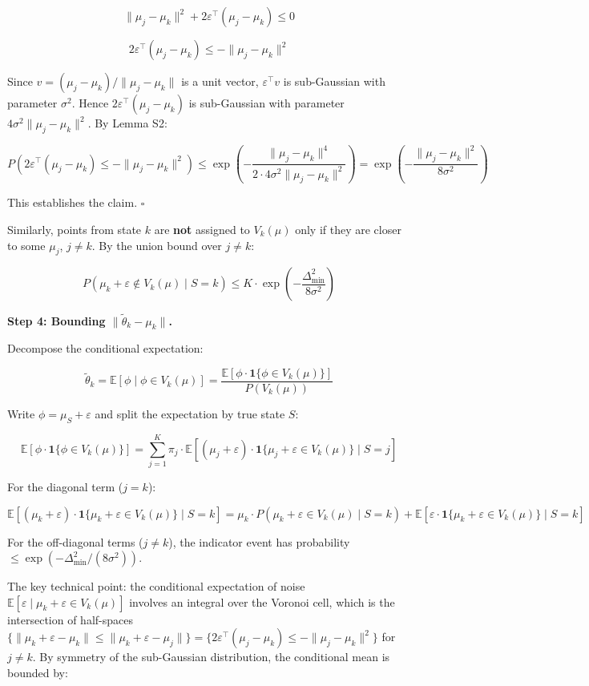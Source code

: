 \documentclass[
  12pt,
]{ctexart}
\begin{document}
\[\|\mu_j - \mu_k\|^2 + 2\varepsilon^\top(\mu_j - \mu_k) \leq 0\]

\[2\varepsilon^\top(\mu_j - \mu_k) \leq -\|\mu_j - \mu_k\|^2\]

Since \(v = (\mu_j - \mu_k)/\|\mu_j - \mu_k\|\) is a unit vector,
\(\varepsilon^\top v\) is sub-Gaussian with parameter \(\sigma^2\).
Hence \(2\varepsilon^\top(\mu_j - \mu_k)\) is sub-Gaussian with
parameter \(4\sigma^2\|\mu_j - \mu_k\|^2\). By Lemma S2:

\[P\left(2\varepsilon^\top(\mu_j - \mu_k) \leq -\|\mu_j - \mu_k\|^2\right) \leq \exp\left(-\frac{\|\mu_j - \mu_k\|^4}{2 \cdot 4\sigma^2 \|\mu_j - \mu_k\|^2}\right) = \exp\left(-\frac{\|\mu_j - \mu_k\|^2}{8\sigma^2}\right)\]

This establishes the claim. \(\square\)

Similarly, points from state \(k\) are \textbf{not} assigned to
\(V_k(\mu)\) only if they are closer to some \(\mu_j\), \(j \neq k\). By
the union bound over \(j \neq k\):

\[P(\mu_k + \varepsilon \notin V_k(\mu) \mid S=k) \leq K \cdot \exp\left(-\frac{\Delta_{\min}^2}{8\sigma^2}\right)\]

\textbf{Step 4: Bounding \(\|\tilde{\theta}_k - \mu_k\|\).}

Decompose the conditional expectation:

\[\tilde{\theta}_k = \mathbb{E}[\phi \mid \phi \in V_k(\mu)] = \frac{\mathbb{E}[\phi \cdot \mathbf{1}\{\phi \in V_k(\mu)\}]}{P(V_k(\mu))}\]

Write \(\phi = \mu_S + \varepsilon\) and split the expectation by true
state \(S\):

\[\mathbb{E}[\phi \cdot \mathbf{1}\{\phi \in V_k(\mu)\}] = \sum_{j=1}^K \pi_j \cdot \mathbb{E}\left[ (\mu_j + \varepsilon) \cdot \mathbf{1}\{\mu_j + \varepsilon \in V_k(\mu)\} \mid S=j \right]\]

For the diagonal term (\(j=k\)):

\[\mathbb{E}\left[ (\mu_k + \varepsilon) \cdot \mathbf{1}\{\mu_k + \varepsilon \in V_k(\mu)\} \mid S=k \right] = \mu_k \cdot P(\mu_k + \varepsilon \in V_k(\mu) \mid S=k) + \mathbb{E}\left[ \varepsilon \cdot \mathbf{1}\{\mu_k + \varepsilon \in V_k(\mu)\} \mid S=k \right]\]

For the off-diagonal terms (\(j \neq k\)), the indicator event has
probability \(\leq \exp(-\Delta_{\min}^2/(8\sigma^2))\).

The key technical point: the conditional expectation of noise
\(\mathbb{E}[\varepsilon \mid \mu_k + \varepsilon \in V_k(\mu)]\)
involves an integral over the Voronoi cell, which is the intersection of
half-spaces
\(\{\|\mu_k + \varepsilon - \mu_k\| \leq \|\mu_k + \varepsilon - \mu_j\|\} = \{2\varepsilon^\top(\mu_j - \mu_k) \leq -\|\mu_j - \mu_k\|^2\}\)
for \(j \neq k\). By symmetry of the sub-Gaussian distribution, the
conditional mean is bounded by:
\end{document}
